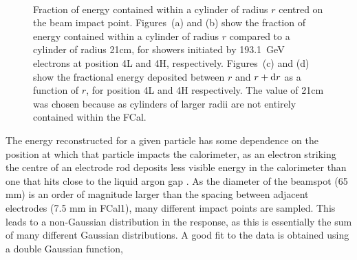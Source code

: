 \begin{figure}[tb]
\begin{centering}
\\
\caption[Radial distribution of the energy deposited by electrons]{Fraction of energy contained within a cylinder of radius $r$ centred on the beam impact point. Figures~(a) and (b) show the fraction of energy contained within a cylinder of radius $r$ compared to a cylinder of radius 21cm, for showers initiated by 193.1~GeV electrons at position 4L and 4H, respectively. Figures~(c) and (d) show the fractional energy deposited between $r$ and $r+\mathrm{d} r$ as a function of $r$, for position 4L and 4H respectively. The value of 21cm was chosen because as cylinders of larger radii are not entirely contained within the FCal. } 
\label{TBplot_electron_radials}
\end{centering}
\end{figure}






The energy reconstructed for a given particle has some dependence on the position at which that particle impacts the calorimeter, as an electron striking the centre of an electrode rod deposits less visible energy in the calorimeter than one that hits close to the liquid argon gap \cite{TB93_prototype,TB98_electron_signals}. As the diameter of the beamspot (65 mm) is an order of magnitude larger than the spacing between adjacent electrodes (7.5 mm in FCal1), many different impact points are sampled. This leads to a non-Gaussian distribution in the response, as this is essentially the sum of many different Gaussian distributions. A good fit to the data is obtained using a double Gaussian function,


